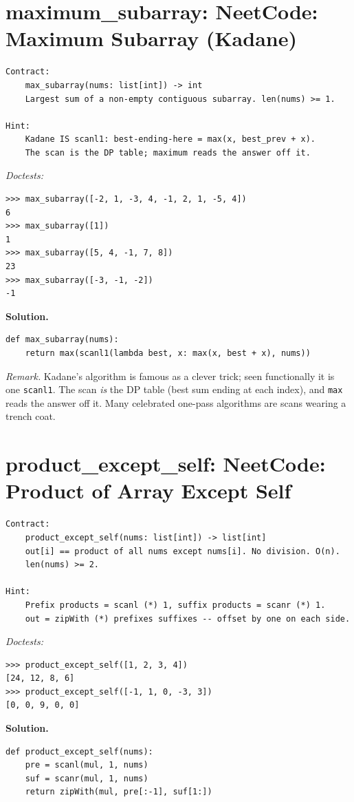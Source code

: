 \documentclass[11pt,letterpaper]{book}
\begin{document}
\section{maximum\_subarray: NeetCode: Maximum Subarray (Kadane)}
\begin{lstlisting}[style=spec]
Contract:
    max_subarray(nums: list[int]) -> int
    Largest sum of a non-empty contiguous subarray. len(nums) >= 1.

Hint:
    Kadane IS scanl1: best-ending-here = max(x, best_prev + x).
    The scan is the DP table; maximum reads the answer off it.
\end{lstlisting}
\noindent\textit{Doctests:}
\begin{lstlisting}[style=spec]
>>> max_subarray([-2, 1, -3, 4, -1, 2, 1, -5, 4])
6
>>> max_subarray([1])
1
>>> max_subarray([5, 4, -1, 7, 8])
23
>>> max_subarray([-3, -1, -2])
-1
\end{lstlisting}
\noindent\textbf{Solution.}
\begin{lstlisting}[style=code]
def max_subarray(nums):
    return max(scanl1(lambda best, x: max(x, best + x), nums))
\end{lstlisting}

\noindent\textit{Remark.} Kadane's algorithm is famous as a clever trick; seen
functionally it is one \texttt{scanl1}. The scan \emph{is} the DP table
(best sum ending at each index), and \texttt{max} reads the answer off it. Many
celebrated one-pass algorithms are scans wearing a trench coat.

\section{product\_except\_self: NeetCode: Product of Array Except Self}
\begin{lstlisting}[style=spec]
Contract:
    product_except_self(nums: list[int]) -> list[int]
    out[i] == product of all nums except nums[i]. No division. O(n).
    len(nums) >= 2.

Hint:
    Prefix products = scanl (*) 1, suffix products = scanr (*) 1.
    out = zipWith (*) prefixes suffixes -- offset by one on each side.
\end{lstlisting}
\noindent\textit{Doctests:}
\begin{lstlisting}[style=spec]
>>> product_except_self([1, 2, 3, 4])
[24, 12, 8, 6]
>>> product_except_self([-1, 1, 0, -3, 3])
[0, 0, 9, 0, 0]
\end{lstlisting}
\noindent\textbf{Solution.}
\begin{lstlisting}[style=code]
def product_except_self(nums):
    pre = scanl(mul, 1, nums)
    suf = scanr(mul, 1, nums)
    return zipWith(mul, pre[:-1], suf[1:])
\end{lstlisting}
\end{document}
